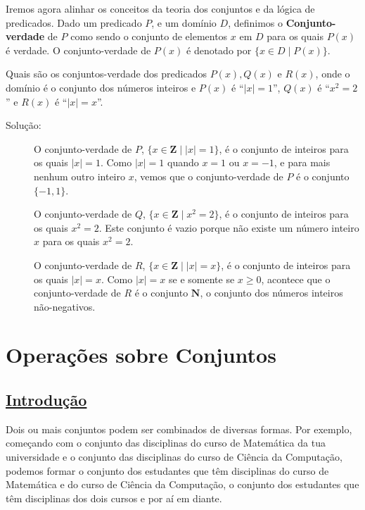 Iremos agora alinhar os conceitos da teoria dos conjuntos e da lógica de
predicados. Dado um predicado $P$, e um domínio $D$, definimos o
\textbf{Conjunto-verdade} de $P$ como sendo o conjunto de elementos $x$ em $D$
para os quais $P(x)$ é verdade. O conjunto-verdade de $P(x)$ é denotado por
$\{x \in D \mid P(x)\}$.

\begin{exmp}
\label{exem314}
Quais são os conjuntos-verdade dos predicados $P(x), Q(x)$ e $R(x)$, onde o
domínio é o conjunto dos números inteiros e $P(x)$ é ``$|x| = 1$'', $Q(x)$ é
``$x^2 = 2$'' e $R(x)$ é ``$|x| = x$''.
\begin{description}
\item[Solução:]O conjunto-verdade de $P$, $\{x \in \textbf{Z} \mid |x| = 1\}$, é
o conjunto de inteiros para os quais $|x| = 1$. Como $|x| = 1$ quando $x=1$ ou
$x=-1$, e para mais nenhum outro inteiro $x$, vemos que o conjunto-verdade de
$P$ é o conjunto $\{-1,1\}$.

O conjunto-verdade de $Q$, $\{x \in \textbf{Z} \mid x^2 = 2\}$, é o conjunto de
inteiros para os quais $x^2 = 2$. Este conjunto é vazio porque não existe um
número inteiro $x$ para os quais $x^2 = 2$.

O conjunto-verdade de $R$, $\{x \in \textbf{Z} \mid |x| = x\}$, é o conjunto de
inteiros para os quais $|x| = x$. Como $|x| = x$ se e somente se $x \geq 0$,
acontece que o conjunto-verdade de $R$ é o conjunto $\textbf{N}$, o conjunto
dos números inteiros não-negativos.
\end{description}
\end{exmp}

\section{Operações sobre Conjuntos}

\subsection*{\underline{Introdução}}

Dois ou mais conjuntos podem ser combinados de diversas formas. Por exemplo,
começando com o conjunto das disciplinas do curso de Matemática da tua
universidade e o conjunto das disciplinas do curso de Ciência da Computação,
podemos formar o conjunto dos estudantes que têm disciplinas do curso de
Matemática e do curso de Ciência da Computação, o conjunto dos estudantes que
têm disciplinas dos dois cursos e por aí em diante.

